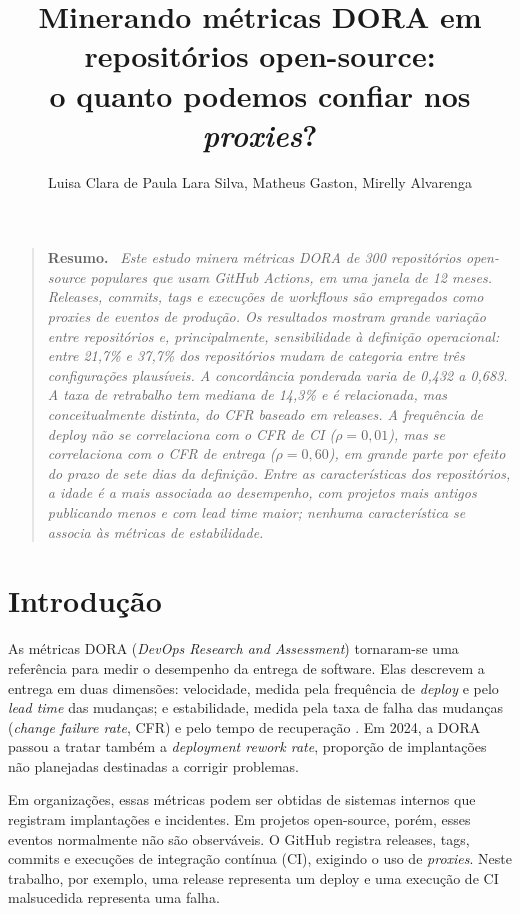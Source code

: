 \documentclass[12pt]{article}
\title{Minerando métricas DORA em repositórios open-source:\\
o quanto podemos confiar nos \textit{proxies}?}
\author{Luisa Clara de Paula Lara Silva, Matheus Gaston, Mirelly Alvarenga}
\newenvironment{resumo}
    {\begin{quote}\noindent\textbf{Resumo.}\ \itshape}
    {\end{quote}}
\begin{document}
\maketitle

\begin{resumo}
Este estudo minera métricas DORA de 300 repositórios open-source populares
que usam GitHub Actions, em uma janela de 12 meses. Releases, commits, tags e
execuções de workflows são empregados como proxies de eventos de produção.
Os resultados mostram grande variação entre repositórios e, principalmente,
sensibilidade à definição operacional: entre 21,7\% e 37,7\% dos repositórios
mudam de categoria entre três configurações plausíveis. A concordância
ponderada varia de 0,432 a 0,683. A taxa de retrabalho tem mediana de 14,3\% e
é relacionada, mas conceitualmente distinta, do CFR baseado em releases. A
frequência de deploy não se correlaciona com o CFR de CI ($\rho=0{,}01$),
mas se correlaciona com o CFR de entrega ($\rho=0{,}60$), em grande parte por
efeito do prazo de sete dias da definição. Entre as características dos
repositórios, a idade é a mais associada ao desempenho, com projetos mais
antigos publicando menos e com \textit{lead time} maior; nenhuma
característica se associa às métricas de estabilidade.
\end{resumo}

\section{Introdução}

As métricas DORA (\textit{DevOps Research and Assessment}) tornaram-se uma
referência para medir o desempenho da entrega de software. Elas descrevem a
entrega em duas dimensões: velocidade, medida pela frequência de
\textit{deploy} e pelo \textit{lead time} das mudanças; e estabilidade, medida
pela taxa de falha das mudanças (\textit{change failure rate}, CFR) e pelo
tempo de recuperação \cite{forsgren2018,dora2024}. Em 2024, a DORA passou a
tratar também a \textit{deployment rework rate}, proporção de implantações não
planejadas destinadas a corrigir problemas.

Em organizações, essas métricas podem ser obtidas de sistemas internos que
registram implantações e incidentes. Em projetos open-source, porém, esses
eventos normalmente não são observáveis. O GitHub registra releases, tags,
commits e execuções de integração contínua (CI), exigindo o uso de
\textit{proxies}. Neste trabalho, por exemplo, uma release representa um
deploy e uma execução de CI malsucedida representa uma falha.
\end{document}
